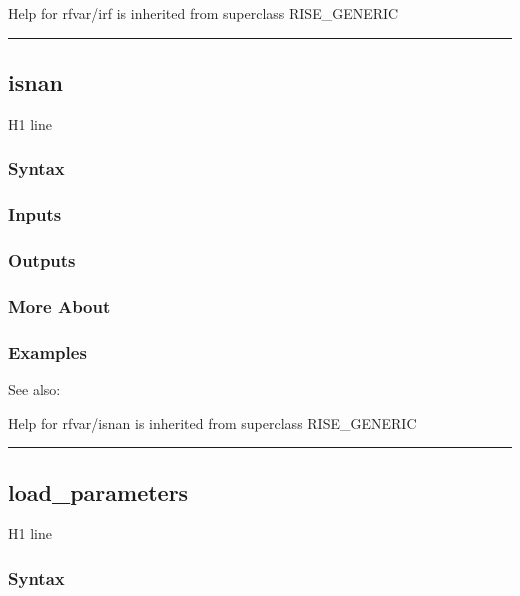 \documentclass[letterpaper,10pt,english]{sphinxmanual}
\begin{document}
Help for rfvar/irf is inherited from superclass RISE\_GENERIC


\bigskip\hrule{}\bigskip



\subsection{isnan}
\label{classes/models/@rfvar/rfvar:isnan}\label{classes/models/@rfvar/rfvar:id40}
H1 line


\subsubsection{Syntax}
\label{classes/models/@rfvar/rfvar:id41}

\subsubsection{Inputs}
\label{classes/models/@rfvar/rfvar:id42}

\subsubsection{Outputs}
\label{classes/models/@rfvar/rfvar:id43}

\subsubsection{More About}
\label{classes/models/@rfvar/rfvar:id44}

\subsubsection{Examples}
\label{classes/models/@rfvar/rfvar:id45}
See also:

Help for rfvar/isnan is inherited from superclass RISE\_GENERIC


\bigskip\hrule{}\bigskip



\subsection{load\_parameters}
\label{classes/models/@rfvar/rfvar:id46}\label{classes/models/@rfvar/rfvar:load-parameters}
H1 line


\subsubsection{Syntax}
\label{classes/models/@rfvar/rfvar:id47}
\end{document}
